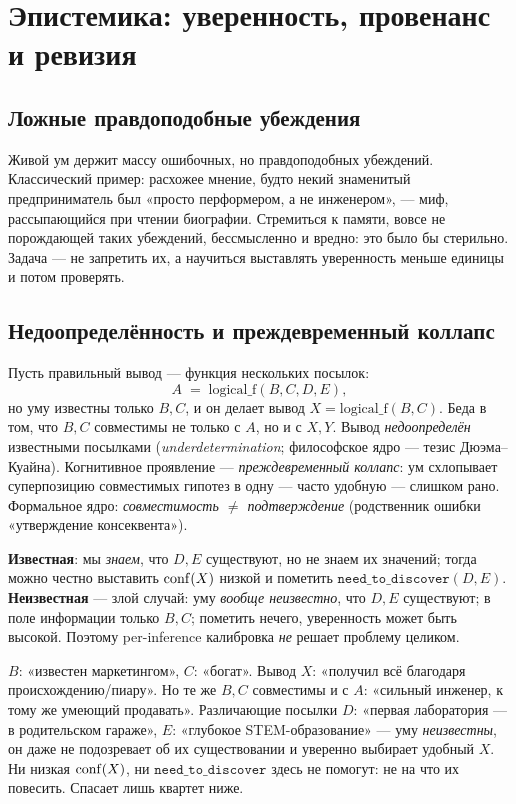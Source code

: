 \chapter{Эпистемика: уверенность, провенанс и ревизия}
\label{ch:epistemics}

\section{Ложные правдоподобные убеждения}

Живой ум держит массу ошибочных, но правдоподобных убеждений. Классический пример:
расхожее мнение, будто некий знаменитый предприниматель был «просто перформером, а
не инженером», — миф, рассыпающийся при чтении биографии. Стремиться к памяти,
вовсе не порождающей таких убеждений, бессмысленно и вредно: это было бы стерильно.
Задача — не запретить их, а научиться выставлять уверенность меньше единицы и потом
проверять.

\section{Недоопределённость и преждевременный коллапс}

Пусть правильный вывод — функция нескольких посылок:
\[
A \;=\; \text{logical\_f}(B, C, D, E),
\]
но уму известны только $B, C$, и он делает вывод $X = \text{logical\_f}(B, C)$.
Беда в том, что $B, C$ совместимы не только с $A$, но и с $X, Y$. Вывод
\emph{недоопределён} известными посылками (\emph{underdetermination}; философское
ядро — тезис Дюэма–Куайна). Когнитивное проявление — \emph{преждевременный коллапс}:
ум схлопывает суперпозицию совместимых гипотез в одну — часто удобную — слишком
рано. Формальное ядро: \emph{совместимость $\ne$ подтверждение} (родственник ошибки
«утверждение консеквента»).

\begin{pitfall}
\textbf{Известная}: мы \emph{знаем}, что $D,E$ существуют, но не знаем их значений;
тогда можно честно выставить $\mathrm{conf}(X)$ низкой и пометить
$\texttt{need\_to\_discover}(D,E)$. \textbf{Неизвестная} — злой случай: уму
\emph{вообще неизвестно}, что $D,E$ существуют; в поле информации только $B,C$;
пометить нечего, уверенность может быть высокой. Поэтому per-inference калибровка
\emph{не} решает проблему целиком.
\end{pitfall}

\begin{workedbox}
$B$: «известен маркетингом», $C$: «богат». Вывод $X$: «получил всё благодаря
происхождению/пиару». Но те же $B,C$ совместимы и с $A$: «сильный инженер, к тому
же умеющий продавать». Различающие посылки $D$: «первая лаборатория — в родительском
гараже», $E$: «глубокое STEM-образование» — уму \emph{неизвестны}, он даже не
подозревает об их существовании и уверенно выбирает удобный $X$. Ни низкая
$\mathrm{conf}(X)$, ни $\texttt{need\_to\_discover}$ здесь не помогут: не на что их повесить.
Спасает лишь квартет ниже.
\end{workedbox}

